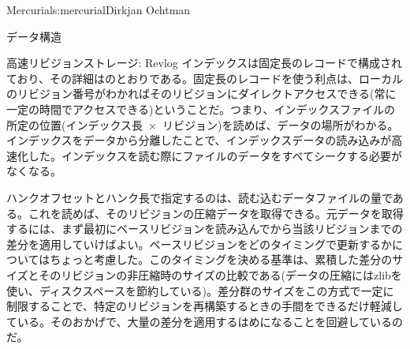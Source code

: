\begin{aosachapter}{Mercurial}{s:mercurial}{Dirkjan Ochtman}
\begin{aosasect1}{データ構造}
\begin{aosasect2}{高速リビジョンストレージ: Revlog}
インデックスは固定長のレコードで構成されており、その詳細はのとおりである。固定長のレコードを使う利点は、ローカルのリビジョン番号がわかればそのリビジョンにダイレクトアクセスできる(常に一定の時間でアクセスできる)ということだ。つまり、インデックスファイルの所定の位置(インデックス長~$\times$~リビジョン)を読めば、データの場所がわかる。インデックスをデータから分離したことで、インデックスデータの読み込みが高速化した。インデックスを読む際にファイルのデータをすべてシークする必要がなくなる。

ハンクオフセットとハンク長で指定するのは、読む込むデータファイルの量である。これを読めば、そのリビジョンの圧縮データを取得できる。元データを取得するには、まず最初にベースリビジョンを読み込んでから当該リビジョンまでの差分を適用していけばよい。ベースリビジョンをどのタイミングで更新するかについてはちょっと考慮した。このタイミングを決める基準は、累積した差分のサイズとそのリビジョンの非圧縮時のサイズの比較である(データの圧縮にはzlibを使い、ディスクスペースを節約している)。差分群のサイズをこの方式で一定に制限することで、特定のリビジョンを再構築するときの手間をできるだけ軽減している。そのおかげで、大量の差分を適用するはめになることを回避しているのだ。


\end{aosasect2}
\end{aosasect1}
\end{aosachapter}
